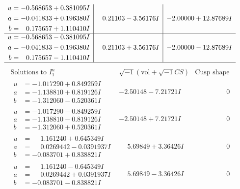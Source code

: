 \documentclass[1p]{elsarticle_modified}
\theoremstyle{definition}
\newcommand{\I}{\sqrt{-1}}
\begin{document}
$$\begin{array}{c|c|c}
\begin{aligned}
u &= -0.568653 + 0.381095 I \\
a &= -0.041833 + 0.196380 I \\
b &= \phantom{-}0.175657 + 1.110410 I\end{aligned}
 & \phantom{-}0.21103 - 3.56176 I & -2.00000 + 12.87689 I \\ \hline\begin{aligned}
u &= -0.568653 - 0.381095 I \\
a &= -0.041833 - 0.196380 I \\
b &= \phantom{-}0.175657 - 1.110410 I\end{aligned}
 & \phantom{-}0.21103 + 3.56176 I & -2.00000 - 12.87689 I\\
 \hline 
 \end{array}$$\newpage$$\begin{array}{c|c|c}  
\text{Solutions to }I^u_{1}& \I (\text{vol} + \sqrt{-1}CS) & \text{Cusp shape}\\
 \hline 
\begin{aligned}
u &= -1.017290 + 0.849259 I \\
a &= -1.138810 + 0.819126 I \\
b &= -1.312060 - 0.520361 I\end{aligned}
 & -2.50148 - 7.21721 I & \phantom{-0.000000 } 0 \\ \hline\begin{aligned}
u &= -1.017290 - 0.849259 I \\
a &= -1.138810 - 0.819126 I \\
b &= -1.312060 + 0.520361 I\end{aligned}
 & -2.50148 + 7.21721 I & \phantom{-0.000000 } 0 \\ \hline\begin{aligned}
u &= \phantom{-}1.161240 + 0.645349 I \\
a &= \phantom{-}0.0269442 - 0.0391937 I \\
b &= -0.083701 + 0.838821 I\end{aligned}
 & \phantom{-}5.69849 + 3.36426 I & \phantom{-0.000000 } 0 \\ \hline\begin{aligned}
u &= \phantom{-}1.161240 - 0.645349 I \\
a &= \phantom{-}0.0269442 + 0.0391937 I \\
b &= -0.083701 - 0.838821 I\end{aligned}
 & \phantom{-}5.69849 - 3.36426 I & \phantom{-0.000000 } 0 \\ \hline\begin{aligned}

\end{aligned}
\end{array}$$
\end{document}
